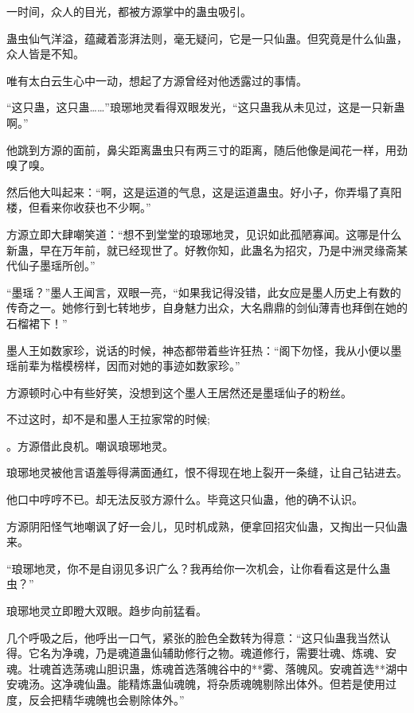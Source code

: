 
\begin{this_body}

一时间，众人的目光，都被方源掌中的蛊虫吸引。

蛊虫仙气洋溢，蕴藏着澎湃法则，毫无疑问，它是一只仙蛊。但究竟是什么仙蛊，众人皆是不知。

唯有太白云生心中一动，想起了方源曾经对他透露过的事情。

“这只蛊，这只蛊……”琅琊地灵看得双眼发光，“这只蛊我从未见过，这是一只新蛊啊。”

他跳到方源的面前，鼻尖距离蛊虫只有两三寸的距离，随后他像是闻花一样，用劲嗅了嗅。

然后他大叫起来：“啊，这是运道的气息，这是运道蛊虫。好小子，你弄塌了真阳楼，但看来你收获也不少啊。”

方源立即大肆嘲笑道：“想不到堂堂的琅琊地灵，见识如此孤陋寡闻。这哪是什么新蛊，早在万年前，就已经现世了。好教你知，此蛊名为招灾，乃是中洲灵缘斋某代仙子墨瑶所创。”

“墨瑶？”墨人王闻言，双眼一亮，“如果我记得没错，此女应是墨人历史上有数的传奇之一。她修行到七转地步，自身魅力出众，大名鼎鼎的剑仙薄青也拜倒在她的石榴裙下！”

墨人王如数家珍，说话的时候，神态都带着些许狂热：“阁下勿怪，我从小便以墨瑶前辈为楷模榜样，因而对她的事迹如数家珍。”

方源顿时心中有些好笑，没想到这个墨人王居然还是墨瑶仙子的粉丝。

不过这时，却不是和墨人王拉家常的时候;

。方源借此良机。嘲讽琅琊地灵。

琅琊地灵被他言语羞辱得满面通红，恨不得现在地上裂开一条缝，让自己钻进去。

他口中哼哼不已。却无法反驳方源什么。毕竟这只仙蛊，他的确不认识。

方源阴阳怪气地嘲讽了好一会儿，见时机成熟，便拿回招灾仙蛊，又掏出一只仙蛊来。

“琅琊地灵，你不是自诩见多识广么？我再给你一次机会，让你看看这是什么蛊虫？”

琅琊地灵立即瞪大双眼。趋步向前猛看。

几个呼吸之后，他呼出一口气，紧张的脸色全数转为得意：“这只仙蛊我当然认得。它名为净魂，乃是魂道蛊仙辅助修行之物。魂道修行，需要壮魂、炼魂、安魂。壮魂首选荡魂山胆识蛊，炼魂首选落魄谷中的**雾、落魄风。安魂首选**湖中安魂汤。这净魂仙蛊。能精炼蛊仙魂魄，将杂质魂魄剔除出体外。但若是使用过度，反会把精华魂魄也会剔除体外。”


\end{this_body}
